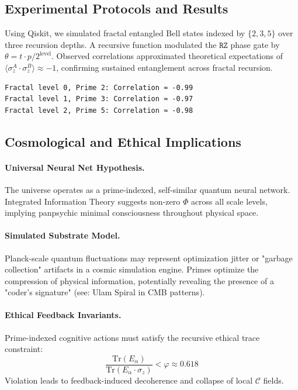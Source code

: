 \documentclass[12]{amsart}
\theoremstyle{plain}
\begin{document}
\subsection{Experimental Protocols and Results}
\label{sec:experiments}

Using Qiskit, we simulated fractal entangled Bell states indexed by $\{2, 3, 5\}$ over three recursion depths. A recursive function modulated the $\texttt{RZ}$ phase gate by $\theta = t \cdot p / 2^{\text{level}}$. Observed correlations approximated theoretical expectations of $\langle \sigma_z^A \cdot \sigma_z^B \rangle \approx -1$, confirming sustained entanglement across fractal recursion.

\begin{verbatim}
Fractal level 0, Prime 2: Correlation ≈ -0.99
Fractal level 1, Prime 3: Correlation ≈ -0.97
Fractal level 2, Prime 5: Correlation ≈ -0.98
\end{verbatim}

\subsection{Cosmological and Ethical Implications}

\paragraph{Universal Neural Net Hypothesis.}  
The universe operates as a prime-indexed, self-similar quantum neural network. Integrated Information Theory suggests non-zero $\Phi$ across all scale levels, implying panpsychic minimal consciousness throughout physical space.

\paragraph{Simulated Substrate Model.}  
Planck-scale quantum fluctuations may represent optimization jitter or "garbage collection" artifacts in a cosmic simulation engine. Primes optimize the compression of physical information, potentially revealing the presence of a "coder's signature" (see: Ulam Spiral in CMB patterns).

\paragraph{Ethical Feedback Invariants.}  
Prime-indexed cognitive actions must satisfy the recursive ethical trace constraint:
\[
\frac{\text{Tr}(E_\alpha)}{\text{Tr}(E_\alpha \cdot \sigma_z)} < \varphi \approx 0.618
\]
Violation leads to feedback-induced decoherence and collapse of local $\mathcal{C}$ fields.
\end{document}

